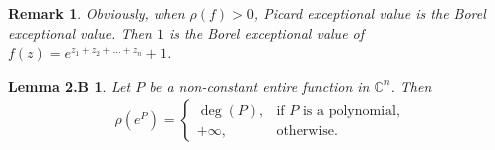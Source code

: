 \documentclass[11pt,reqno]{amsart}
\newtheorem*{lem2B}{Lemma 2.B}
\newtheorem{rem}{Remark}[section]
\numberwithin{equation}{section}
\begin{document}
\begin{rem} Obviously, when $\rho(f)>0$, Picard exceptional value is the Borel exceptional value. Then $1$ is the Borel exceptional value of $f(z)=e^{z_1+z_2+\ldots+z_n}+1$.
\end{rem}

\begin{lem2B}\label{2A}\cite[Lemma 3.59]{Hu-Li-Yang-2003} Let $P$ be a non-constant entire function in $\mathbb{C}^n$. Then 
\begin{align*}
\rho(e^P)=
\begin{cases}
\deg(P), & \text{if $P$ is a polynomial,}\\
+\infty, & \text{otherwise.}
\end{cases}
\end{align*}
\end{lem2B}
\end{document}
